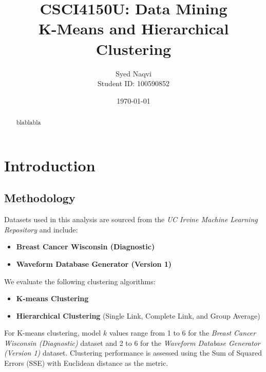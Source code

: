 \documentclass{article}
\title{\textbf{CSCI4150U: Data Mining}\\K-Means and Hierarchical Clustering}
\author{Syed Naqvi \\ Student ID: 100590852}
\date{\today}
\begin{document}
\maketitle

\begin{abstract}
blablabla
\end{abstract}

\section{Introduction}

\subsection{Methodology}
Datasets used in this analysis are sourced from the \textit{UC Irvine Machine Learning Repository} and include:
\begin{itemize}
    \item \textbf{Breast Cancer Wisconsin (Diagnostic)}
    \item \textbf{Waveform Database Generator (Version 1)}
\end{itemize}

We evaluate the following clustering algorithms:
\begin{itemize}
    \item \textbf{K-means Clustering}
    \item \textbf{Hierarchical Clustering} (Single Link, Complete Link, and Group Average)
\end{itemize}

For K-means clustering, model \( k \) values range from 1 to 6 for the \textit{Breast Cancer Wisconsin (Diagnostic)} dataset
and 2 to 6 for the \textit{Waveform Database Generator (Version 1)} dataset. Clustering performance is assessed using the Sum of Squared Errors
(SSE) with Euclidean distance as the metric.

\newpage
\end{document}
